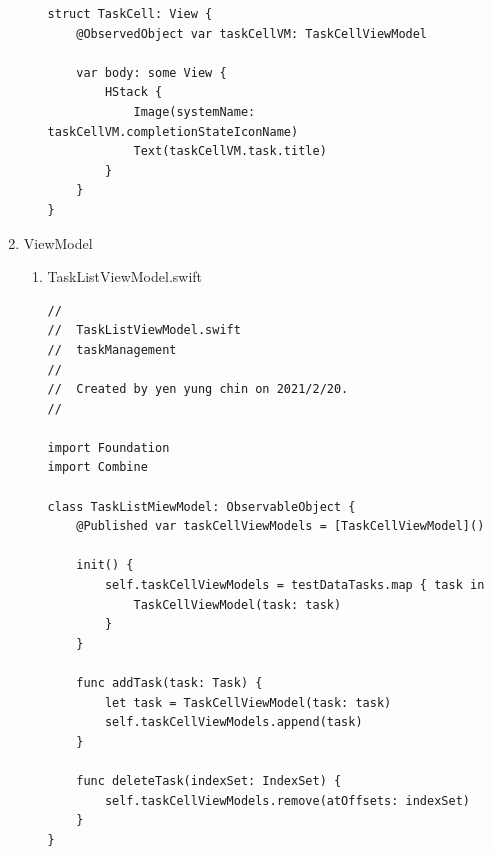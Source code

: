 \documentclass[a4paper,12pt]{article}
\begin{document}
\begin{enumerate}
\begin{enumerate}
\begin{lstlisting}
struct TaskCell: View {
    @ObservedObject var taskCellVM: TaskCellViewModel

    var body: some View {
        HStack {
            Image(systemName: taskCellVM.completionStateIconName)
            Text(taskCellVM.task.title)
        }
    }
}

\end{lstlisting}
\end{enumerate}
\item ViewModel
\label{sec:org4ac2368}
\begin{enumerate}
\item TaskListViewModel.swift
\label{sec:org037e831}
\lstset{breaklines=true,language=swift,label= ,caption= ,captionpos=b,firstnumber=1,numbers=left}
\begin{lstlisting}
//
//  TaskListViewModel.swift
//  taskManagement
//
//  Created by yen yung chin on 2021/2/20.
//

import Foundation
import Combine

class TaskListMiewModel: ObservableObject {
    @Published var taskCellViewModels = [TaskCellViewModel]()

    init() {
        self.taskCellViewModels = testDataTasks.map { task in
            TaskCellViewModel(task: task)
        }
    }

    func addTask(task: Task) {
        let task = TaskCellViewModel(task: task)
        self.taskCellViewModels.append(task)
    }

    func deleteTask(indexSet: IndexSet) {
        self.taskCellViewModels.remove(atOffsets: indexSet)
    }
}

\end{lstlisting}
\end{enumerate}
\end{enumerate}
\end{document}

